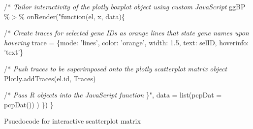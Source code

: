 \documentclass[parskip=full]{bmcart}
\begin{document}
\begin{algorithm}[H]
\Indp/* \textit{Tailor interactivity of the plotly boxplot object using custom JavaScript}\;
ggBP \%$>$\% onRender("function(el, x, data)\{\;

\Indp/* \textit{Create traces for selected gene IDs as orange lines that state gene names upon hovering}\;
trace = \{mode: 'lines', color: 'orange', width: 1.5, text: selID, hoverinfo: 'text'\}\;

/* \textit{Push traces to be superimposed onto the plotly scatterplot matrix object}\;
Plotly.addTraces(el.id, Traces)\;

/* \textit{Pass R objects into the JavaScript function}\;
\Indm\}", data = list(pcpDat = pcpDat())\;
\Indm)\;
\Indm\})\;
\Indm\}\;

\caption{Psuedocode for interactive scatterplot matrix}
\end{algorithm}
\end{document}
